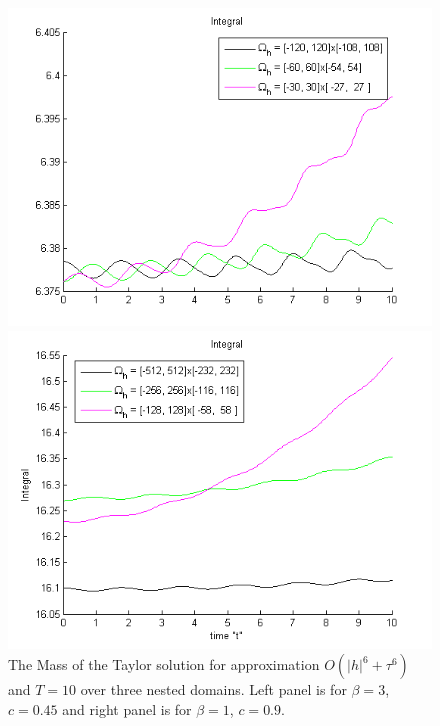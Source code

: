 \documentclass[%
 aip,
cp,  %
 amsmath,amssymb,%
 reprint,%
]{revtex4-2}
\begin{document}
\begin{figure}[ht]\vspace{0.2cm}
	\begin{minipage}[b]{0.4\linewidth}
		\includegraphics[width=\linewidth]{figures/MassTaylor_120_60_30_ZB1_bt3_c045_h020_O(h^6).png}
	\end{minipage}	
	\begin{minipage}[b]{0.4\linewidth}
		\includegraphics[width=\linewidth]{figures/MassTaylor_512_256_128_ZB1_bt1_c090_h040_O(h^6).png}
		
	\end{minipage}
\caption{The Mass of the Taylor solution for approximation $O(|h|^6 + \tau^6)$ and $T = 10$ over three nested domains. Left panel is for $\beta =  3$, $c = 0.45$ and right panel is for $\beta =  1$, $c = 0.9$.}
\label{Test1_2Mass}
\end{figure}
\end{document}
